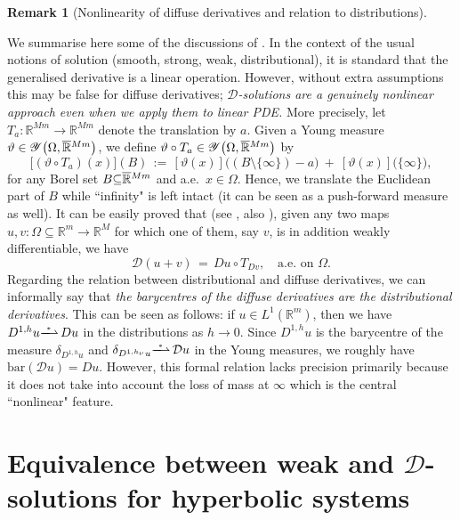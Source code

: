 \documentclass{amsart}
\theoremstyle{definition}
\newtheorem{remark}[theorem]{Remark}
\numberwithin{equation}{section}
\begin{document}
\begin{remark}[Nonlinearity of diffuse derivatives and relation to distributions] \label{remark9} 

We summarise here some of the discussions of \cite{K8}. In the context of the usual notions of solution (smooth, strong, weak, distributional), it is standard that the generalised derivative is a linear operation. However, without extra assumptions this may be false for diffuse derivatives;  \textit{${\mathcal{D}}$-solutions are a genuinely nonlinear  approach even when we apply them to linear PDE.} More precisely, let $T_a : {\mathbb{R}}^{Mm} {\rightarrow}  {\mathbb{R}}^{Mm}$ denote the translation by $a$. Given a Young measure $\vartheta \in \mathscr{Y}\big({\Omega}, \smash{\overline{\mathbb{R}}}^{Mm} \big)$, we define $\vartheta \circ T_a \in \mathscr{Y}\big({\Omega}, \smash{\overline{\mathbb{R}}}^{Mm} \big)$  by
\[
\big[(\vartheta \circ T_a) (x)\big] (B) \, :=\, [\vartheta(x)] \big((B{\setminus} \{\infty\}) - a \big)\ +\ [\vartheta(x)]  \big(\{\infty\}\big),
\]
for any Borel set $B{\subseteq} \smash{\overline{\mathbb{R}}}^{Mm}$ and a.e.\ $x\in{\Omega}$. Hence, we translate the Euclidean part of $B$ while ``infinity" is left intact (it can be seen as a push-forward measure as well). It can be easily proved that (see \cite{K8}, also \cite{FL}), given any  two maps $u,v : {\Omega}{\subseteq} {\mathbb{R}}^m{\longrightarrow} {\mathbb{R}}^M$ for which one of them, say $v$, is in addition weakly differentiable, we have
\[
{\mathcal{D}}(u+v)\, =\, Du \circ T_{Dv},  \ \ \ \text{ a.e.\ on } {\Omega}.
\]
Regarding the relation between distributional and diffuse derivatives, we can informally say that \emph{the barycentres of the diffuse derivatives are the distributional derivatives}. This can be seen as follows: if $u\in L^1({\mathbb{R}}^m)$, then we have $D^{1,h}u \overset{^*}{\smash{-\!\!\!\!-\!\!\!\!\rightharpoonup}}\, Du $ in the distributions as $h{\rightarrow} 0$. Since $D^{1,h}u$ is the barycentre of the measure ${\delta}_{D^{1,h}u}$ and $ {\delta}_{D^{1,h_\nu }u} \overset{^*}{\smash{-\!\!\!\!-\!\!\!\!\rightharpoonup}}\, {\mathcal{D}} u$ in the Young measures, we roughly have $\text{bar}({\mathcal{D}} u)=Du$. However, this formal relation lacks precision primarily because it does not take into account the loss of mass at $\infty$ which is the central ``nonlinear" feature.
\end{remark}

\section{Equivalence between weak and ${\mathcal{D}}$-solutions for hyperbolic systems} \label{section3}
\end{document}
